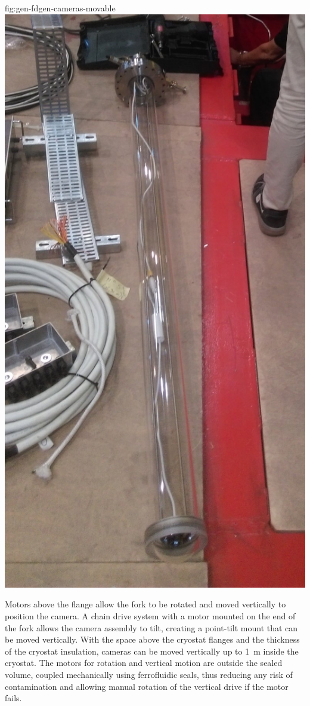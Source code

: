 \begin{dunefigure}{fig:gen-fdgen-cameras-movable}
  \includegraphics[height=0.3\textheight]{graphics/cisc-pdsp-camera-tube}%
\end{dunefigure}

Motors above the flange allow the fork to be rotated and moved vertically to position the camera. 
 A chain drive system with a motor
mounted on the end of the fork allows the camera assembly to tilt, 
creating a point-tilt mount that can be moved vertically.
With the space above the cryostat flanges and the
thickness of the cryostat insulation, cameras can be moved vertically up to
\SI{1}{m} inside the cryostat.
The motors for rotation and vertical motion are outside the sealed
volume, coupled mechanically using ferrofluidic seals, thus reducing any risk of
contamination and allowing manual rotation of the vertical
drive if the motor fails.  

